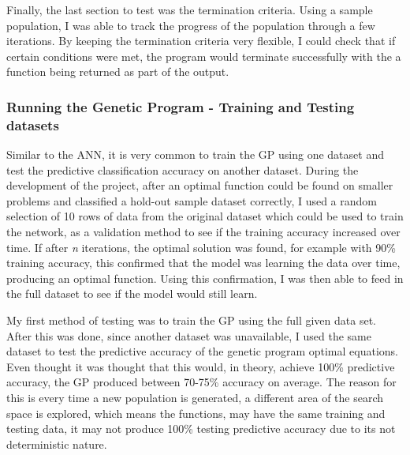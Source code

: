 \documentclass[11pt]{article}
\begin{document}
Finally, the last section to test was the termination criteria. Using a sample population, I was able to track the progress of the population through a few iterations. By keeping the termination criteria very flexible, I could check that if certain conditions were met, the program would terminate successfully with the a function being returned as part of the output. 
\subsubsection{Running the Genetic Program - Training and Testing datasets}\label{subsubsec:RGPTT}
Similar to the ANN, it is very common to train the GP using one dataset and test the predictive classification accuracy on another dataset. During the development of the project, after an optimal function could be found on smaller problems and classified a hold-out sample dataset correctly, I used a random selection of 10 rows of data from the original dataset which could be used to train the network, as a validation method to see if the training accuracy increased over time. If after \textit{n} iterations, the optimal solution was found, for example with 90\% training accuracy, this confirmed that the model was learning the data over time, producing an optimal function. Using this confirmation, I was then able to feed in the full dataset to see if the model would still learn.

My first method of testing was to train the GP using the full given data set. After this was done, since another dataset was unavailable, I used the same dataset to test the predictive accuracy of the genetic program optimal equations. Even thought it was thought that this would, in theory, achieve 100\% predictive accuracy, the GP produced between 70-75\% accuracy on average. The reason for this is every time a new population is generated, a different area of the search space is explored, which means the functions, may have the same training and testing data, it may not produce 100\% testing predictive accuracy due to its not deterministic nature. 
\end{document}
